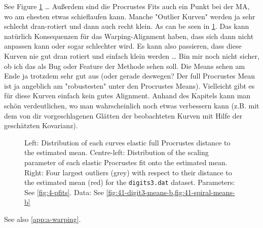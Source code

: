 See Figure \cref{fig:4-outliers} \dots {}
Außerdem sind die Procrustes Fits auch ein Punkt bei der MA, wo am ehesten etwas schieflaufen kann.
Manche "Outlier Kurven" werden ja sehr schlecht dran-rotiert und dann auch recht klein. 
As can be seen in \cref{fig:4-outliers}.
Das kann natürlich Konsequenzen für das Warping-Alignment haben, dass sich dann nicht anpassen kann oder sogar schlechter wird.
Es kann also passieren, dass diese Kurven nie gut dran rotiert und einfach klein werden \dots
Bin mir noch nicht sicher, ob ich das als Bug oder Feature der Methode sehen soll.
Die Means sehen am Ende ja trotzdem sehr gut aus (oder gerade deswegen? 
Der full Procrustes Mean ist ja angeblich am "robustesten" unter den Procrustes Means). 
Vielleicht gibt es für diese Kurven einfach kein gutes Alignment.
Anhand des Kapitels kann man schön verdeutlichen, wo man wahrscheinlich noch etwas verbessern kann (z.B. mit dem von dir vorgeschlagenen Glätten der beobachteten Kurven mit Hilfe der geschätzten Kovarianz). 
\begin{figure}
  \centering
  \begin{subfigure}{0.24\textwidth}
  \end{subfigure}
  \begin{subfigure}{0.24\textwidth}
  \end{subfigure}
  \begin{subfigure}{0.48\textwidth}
    \centering
  \end{subfigure}
  \caption{Left: Distribution of each curves elastic full Procrustes distance to the estimated mean.
  Centre-left: Distribution of the scaling parameter of each elastic Procrustes fit onto the estimated mean.
  Right: Four largest outliers (grey) with respect to their distance to the estimated mean (red) for the \texttt{digits3.dat} dataset.
  Parameters: See \cref{fig:4-pfits}. 
  Data: See \cref{fig:41-digit3-means-b,fig:41-spiral-means-b}}
  \label{fig:4-outliers}
\end{figure}
See also \cref{app:a-warping}.



